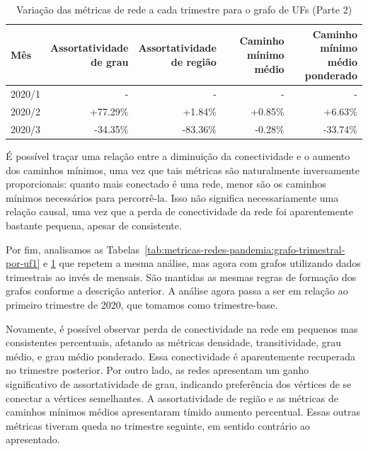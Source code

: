 \begin{table}[htb]
\centering
\caption{Variação das métricas de rede a cada trimestre para o grafo de UFs (Parte 2)}
\label{tab:metricas-redes-pandemia:grafo-trimestral-por-uf2}
\begin{tabular}{l|rrrr}
\toprule
Mês & \shortstack{Assortatividade\\de grau} & \shortstack{Assortatividade\\de região} & \shortstack{Caminho mínimo\\médio} & \shortstack{Caminho mínimo\\médio ponderado} \\
\midrule
2020/1 & - & - & - & - \\
2020/2 & +77.29\% &  +1.84\% & +0.85\% &  +6.63\% \\
2020/3 & -34.35\% & -83.36\% & -0.28\% & -33.74\% \\
\bottomrule
\end{tabular}
\fdadospesquisa
\end{table}

É possível traçar uma relação entre a diminuição da conectividade e o aumento dos caminhos mínimos, uma vez que tais métricas são naturalmente inversamente proporcionais: quanto mais conectado é uma rede, menor são os caminhos mínimos necessários para percorrê-la. Isso não significa necessariamente uma relação causal, uma vez que a perda de conectividade da rede foi aparentemente bastante pequena, apesar de consistente.

Por fim, analisamos as Tabelas~\ref{tab:metricas-redes-pandemia:grafo-trimestral-por-uf1} e \ref{tab:metricas-redes-pandemia:grafo-trimestral-por-uf2} que repetem a mesma análise, mas agora com grafos utilizando dados trimestrais ao invés de mensais. São mantidas as mesmas regras de formação dos grafos conforme a descrição anterior. A análise agora passa a ser em relação ao primeiro trimestre de 2020, que tomamos como trimestre-base.

Novamente, é possível observar perda de conectividade na rede em pequenos mas consistentes percentuais, afetando as métricas densidade, transitividade, grau médio, e grau médio ponderado. Essa conectividade é aparentemente recuperada no trimestre posterior. Por outro lado, as redes apresentam um ganho significativo de assortatividade de grau, indicando preferência dos vértices de se conectar a vértices semelhantes. A assortatividade de região e as métricas de caminhos mínimos médios apresentaram tímido aumento percentual. Essas outras métricas tiveram queda no trimestre seguinte, em sentido contrário ao apresentado.

